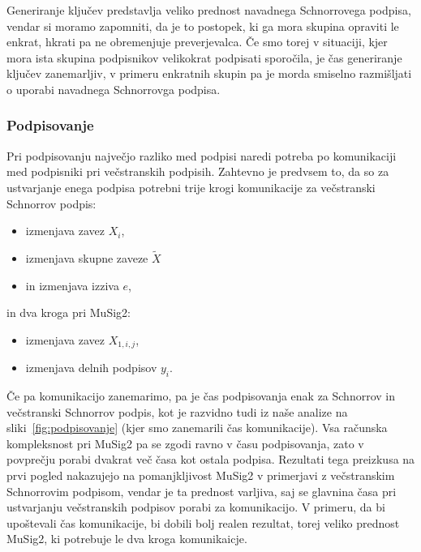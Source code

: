 Generiranje ključev predstavlja veliko prednost navadnega Schnorrovega podpisa, vendar
si moramo zapomniti, da je to postopek, ki ga mora skupina opraviti le enkrat, hkrati pa ne obremenjuje
preverjevalca. Če smo torej v situaciji, kjer mora ista skupina podpisnikov velikokrat podpisati
sporočila, je čas generiranje ključev zanemarljiv, v primeru enkratnih skupin pa je morda smiselno
razmišljati o uporabi navadnega Schnorrovga podpisa.

\subsubsection{Podpisovanje}
Pri podpisovanju največjo razliko med podpisi naredi potreba po komunikaciji med podpisniki pri
večstranskih podpisih. Zahtevno je predvsem to, da so za ustvarjanje enega podpisa potrebni trije
krogi komunikacije za večstranski Schnorrov podpis:
\begin{itemize}
    \item izmenjava zavez $X_i$,
    \item izmenjava skupne zaveze $\tilde{X}$
    \item in izmenjava izziva $e$,
\end{itemize}
in dva kroga pri MuSig2:
\begin{itemize}
    \item izmenjava zavez $X_{1, i, j}$,
    \item izmenjava delnih podpisov $y_i$.
\end{itemize}
Če pa komunikacijo zanemarimo, pa je čas podpisovanja enak za Schnorrov in večstranski Schnorrov podpis,
kot je razvidno tudi iz naše analize na sliki~\ref{fig:podpisovanje} (kjer smo zanemarili čas
komunikacije). Vsa računska kompleksnost pri MuSig2 pa se zgodi ravno v času podpisovanja, zato v
povprečju porabi dvakrat več časa kot ostala podpisa. Rezultati tega preizkusa na prvi pogled
nakazujejo na pomanjkljivost MuSig2 v primerjavi z večstranskim Schnorrovim podpisom, vendar je ta
prednost varljiva, saj se glavnina časa pri ustvarjanju večstranskih podpisov porabi za komunikacijo.
V primeru, da bi upoštevali čas komunikacije, bi dobili bolj realen rezultat, torej veliko prednost
MuSig2, ki potrebuje le dva kroga komunikaicje.

